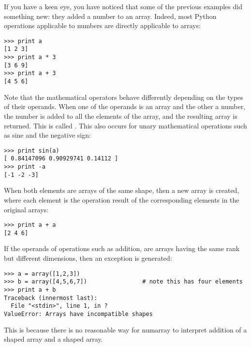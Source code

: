 If you have a keen eye, you have noticed that some of the previous examples did
something new: they added a number to an array. Indeed, most Python operations
applicable to numbers are directly applicable to arrays:
\begin{verbatim}
>>> print a
[1 2 3]
>>> print a * 3
[3 6 9]
>>> print a + 3
[4 5 6]
\end{verbatim}
Note that the mathematical operators behave differently depending on the types
of their operands. When one of the operands is an array and the other a
number, the number is added to all the elements of the array, and the resulting
array is returned. This is called . 
This also occurs for unary mathematical operations such as sine and the 
negative sign:
\begin{verbatim}
>>> print sin(a)
[ 0.84147096 0.90929741 0.14112 ]
>>> print -a
[-1 -2 -3]
\end{verbatim}
When both elements are arrays of the same shape, then a new array is created,
where each element is the operation result of the corresponding elements in 
the original arrays:
\begin{verbatim}
>>> print a + a
[2 4 6]
\end{verbatim}
If the operands of operations such as addition, are arrays having the same
rank but different dimensions, then an exception is generated:
\begin{verbatim}
>>> a = array([1,2,3])
>>> b = array([4,5,6,7])                # note this has four elements
>>> print a + b
Traceback (innermost last):
  File "<stdin>", line 1, in ?
ValueError: Arrays have incompatible shapes
\end{verbatim}
This is because there is no reasonable way for numarray to interpret addition
of a  shaped array and a  shaped array.

